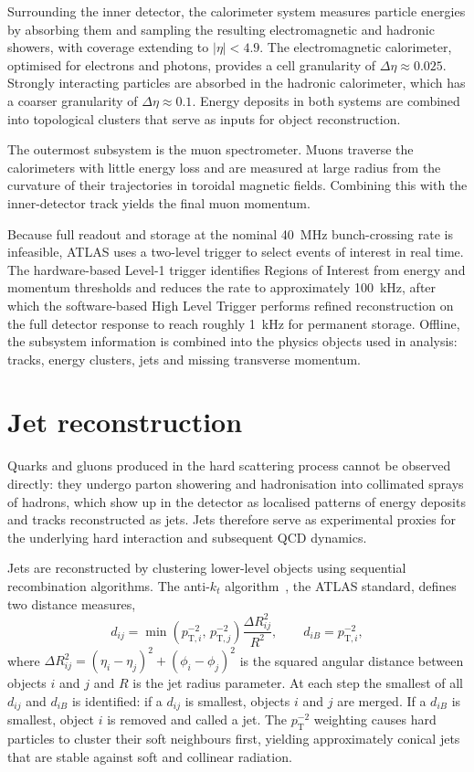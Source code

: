 Surrounding the inner detector, the calorimeter system measures particle energies by absorbing them and sampling the resulting electromagnetic and hadronic showers, with coverage extending to $|\eta| < 4.9$. The electromagnetic calorimeter, optimised for electrons and photons, provides a cell granularity of $\Delta\eta \approx 0.025$. Strongly interacting particles are absorbed in the hadronic calorimeter, which has a coarser granularity of $\Delta\eta \approx 0.1$. Energy deposits in both systems are combined into topological clusters that serve as inputs for object reconstruction.

The outermost subsystem is the muon spectrometer. Muons traverse the calorimeters with little energy loss and are measured at large radius from the curvature of their trajectories in toroidal magnetic fields. Combining this with the inner-detector track yields the final muon momentum.

Because full readout and storage at the nominal 40~MHz bunch-crossing rate is infeasible, ATLAS uses a two-level trigger to select events of interest in real time. The hardware-based Level-1 trigger identifies Regions of Interest from energy and momentum thresholds and reduces the rate to approximately 100~kHz, after which the software-based High Level Trigger performs refined reconstruction on the full detector response to reach roughly 1~kHz for permanent storage. Offline, the subsystem information is combined into the physics objects used in analysis: tracks, energy clusters, jets and missing transverse momentum.

\section{Jet reconstruction}
Quarks and gluons produced in the hard scattering process cannot be observed directly: they undergo parton showering and hadronisation into collimated sprays of hadrons, which show up in the detector as localised patterns of energy deposits and tracks reconstructed as jets. Jets therefore serve as experimental proxies for the underlying hard interaction and subsequent QCD dynamics.

Jets are reconstructed by clustering lower-level objects using sequential recombination algorithms. The anti-$k_t$ algorithm~\cite{Cacciari:2008gp}, the ATLAS standard, defines two distance measures,
\begin{equation}
    d_{ij} = \min\!\left(p_{\mathrm{T},i}^{-2},\, p_{\mathrm{T},j}^{-2}\right) \frac{\Delta R_{ij}^2}{R^2}, \qquad d_{iB} = p_{\mathrm{T},i}^{-2},
\end{equation}
where $\Delta R_{ij}^2 = (\eta_i - \eta_j)^2 + (\phi_i - \phi_j)^2$ is the squared angular distance between objects $i$ and $j$ and $R$ is the jet radius parameter. At each step the smallest of all $d_{ij}$ and $d_{iB}$ is identified: if a $d_{ij}$ is smallest, objects $i$ and $j$ are merged. If a $d_{iB}$ is smallest, object $i$ is removed and called a jet. The $p_{\mathrm{T}}^{-2}$ weighting causes hard particles to cluster their soft neighbours first, yielding approximately conical jets that are stable against soft and collinear radiation.


